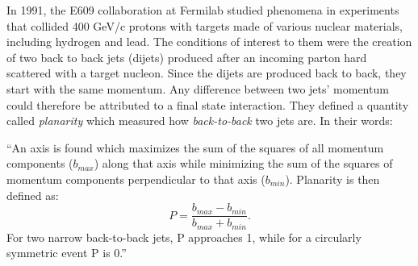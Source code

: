 In 1991, the E609 collaboration at Fermilab studied phenomena in experiments that collided 400 GeV/c protons with targets made of various nuclear materials, including hydrogen and lead\citep{Corcoran:1990vq}. The conditions of interest to them were the creation of two back to back jets (dijets) produced after an incoming parton hard scattered with a target nucleon. Since the dijets are produced back to back, they start with the same momentum. Any difference between two jets' momentum could therefore be attributed to a final state interaction. They defined a quantity called \textit{planarity} which measured how \textit{back-to-back} two jets are. In their words:
\begin{addmargin}[1.5em]{2em}
``An axis is found which maximizes the sum of the squares of all momentum components ($b_{max}$) along that axis while minimizing the sum of the squares of momentum components perpendicular to that axis ($b_{min}$). Planarity is then defined as: 
\begin{equation}
P = \frac{b_{max}-b_{min}}{b_{max}+b_{min}}.
\end{equation}
For two narrow back-to-back jets, P approaches 1, while for a circularly symmetric event P is 0.''
\end{addmargin}

